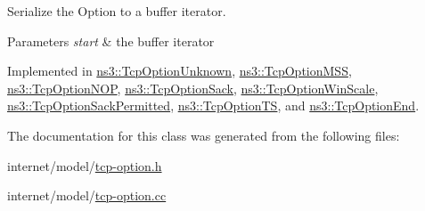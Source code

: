 Serialize the Option to a buffer iterator. 


\begin{DoxyParams}{Parameters}
{\em start} & the buffer iterator \\
\hline
\end{DoxyParams}


Implemented in \hyperlink{classns3_1_1TcpOptionUnknown_af7aabfed964607f8a37cfc381bfa3fbd}{ns3\+::\+Tcp\+Option\+Unknown}, \hyperlink{classns3_1_1TcpOptionMSS_a215e1d74349d02e8673da02c96a81f1e}{ns3\+::\+Tcp\+Option\+M\+SS}, \hyperlink{classns3_1_1TcpOptionNOP_a64ddd8ac034f39f32239e2a93863037d}{ns3\+::\+Tcp\+Option\+N\+OP}, \hyperlink{classns3_1_1TcpOptionSack_abf2142e86a79a0549b256e58026d0083}{ns3\+::\+Tcp\+Option\+Sack}, \hyperlink{classns3_1_1TcpOptionWinScale_ac0cc4f3dfef1d0d7e03725fc83acd3b0}{ns3\+::\+Tcp\+Option\+Win\+Scale}, \hyperlink{classns3_1_1TcpOptionSackPermitted_ab00be0ac26a17085142b804090eab53c}{ns3\+::\+Tcp\+Option\+Sack\+Permitted}, \hyperlink{classns3_1_1TcpOptionTS_a78c958095d201d40006442a5cea4e41d}{ns3\+::\+Tcp\+Option\+TS}, and \hyperlink{classns3_1_1TcpOptionEnd_aa2b70fc2a8d0ed99ba01cb0d832023a1}{ns3\+::\+Tcp\+Option\+End}.



The documentation for this class was generated from the following files\+:\begin{DoxyCompactItemize}
\item 
internet/model/\hyperlink{tcp-option_8h}{tcp-\/option.\+h}\item 
internet/model/\hyperlink{tcp-option_8cc}{tcp-\/option.\+cc}\end{DoxyCompactItemize}
